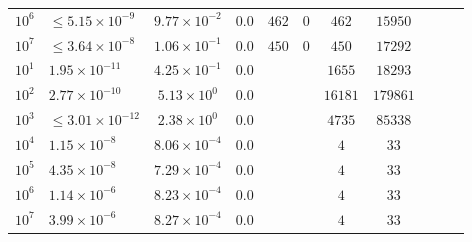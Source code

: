 \begin{tabular}{l l c c c c c c c c c}
    $10^6$  &  $\leq 5.15 \times 10^{-9}$  &  $9.77 \times 10^{-2}$  &  $0.0$  &  $462$  &  $0$  &  $462$  &  $15950$  & & & \\ 
    $10^7$  &  $\leq 3.64 \times 10^{-8}$  &  $1.06 \times 10^{-1}$  &  $0.0$  &  $450$  &  $0$  &  $450$  &  $17292$  & & & \\ 
\hline \hline
$10^1$  &  $1.95 \times 10^{-11}$  &  $4.25 \times 10^{-1}$ & $0.0$ &  &  & $1655$ & $18293$ & & & \\ 
$10^2$  &  $2.77 \times 10^{-10}$  &  $5.13 \times 10^{0}$ & $0.0$ &  &  & $16181$ & $179861$ & & & \\ 
$10^3$  &  $\leq 3.01 \times 10^{-12}$  &  $2.38 \times 10^{0}$ & $0.0$ &  &  & $4735$ & $85338$ & & & \\ 
$10^4$  &  $1.15 \times 10^{-8}$  &  $8.06 \times 10^{-4}$ & $0.0$ &  &  & $4$ & $33$ & & & \\ 
$10^5$  &  $4.35 \times 10^{-8}$  &  $7.29 \times 10^{-4}$ & $0.0$ &  &  & $4$ & $33$ & & & \\ 
$10^6$  &  $1.14 \times 10^{-6}$  &  $8.23 \times 10^{-4}$ & $0.0$ &  &  & $4$ & $33$ & & & \\ 
$10^7$  &  $3.99 \times 10^{-6}$  &  $8.27 \times 10^{-4}$ & $0.0$ &  &  & $4$ & $33$ & & & \\ 
\end{tabular}
